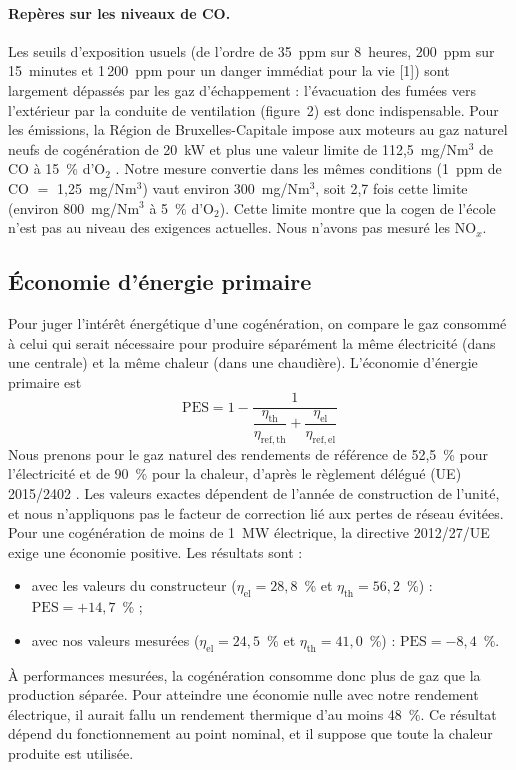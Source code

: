 \paragraph{Repères sur les niveaux de CO.} Les seuils d'exposition
usuels (de l'ordre de 35~ppm sur 8~heures, 200~ppm sur 15~minutes et
1\,200~ppm pour un danger immédiat pour la vie [1]) sont largement
dépassés par les gaz d'échappement : l'évacuation des fumées vers
l'extérieur par la conduite de ventilation (figure~2) est donc
indispensable. Pour les émissions, la Région de Bruxelles-Capitale
impose aux moteurs au gaz naturel neufs de cogénération de 20~kW et plus
une valeur limite de 112,5~mg/Nm$^3$ de CO à 15~\% d'O$_2$
\cite{bxl_cogeneration}. Notre mesure convertie dans les mêmes
conditions (1~ppm de CO $=$ 1,25~mg/Nm$^3$) vaut environ 300~mg/Nm$^3$,
soit 2,7 fois cette limite (environ 800~mg/Nm$^3$ à 5~\% d'O$_2$). Cette
limite montre que la cogen de l'école n'est pas au
niveau des exigences actuelles. Nous n'avons pas mesuré les NO$_x$.

\subsection{Économie d'énergie primaire}
\label{sec:pes}

Pour juger l'intérêt énergétique d'une cogénération, on compare le gaz
consommé à celui qui serait nécessaire pour produire séparément la même
électricité (dans une centrale) et la même chaleur (dans une chaudière).
L'économie d'énergie primaire est
\begin{equation}
  \mathrm{PES} = 1 - \frac{1}{\dfrac{\eta_{\mathrm{th}}}{\eta_{\mathrm{ref,th}}} + \dfrac{\eta_{\mathrm{el}}}{\eta_{\mathrm{ref,el}}}}
  \label{eq:pes}
\end{equation}
Nous prenons pour le gaz naturel des rendements de référence de 52,5~\%
pour l'électricité et de 90~\% pour la chaleur, d'après le règlement
délégué (UE) 2015/2402 \cite{reglement_ref}. Les valeurs exactes
dépendent de l'année de construction de l'unité, et nous n'appliquons
pas le facteur de correction lié aux pertes de réseau évitées. Pour une
cogénération de moins de 1~MW électrique, la directive 2012/27/UE exige
une économie positive. Les résultats sont :
\begin{itemize}
  \item avec les valeurs du constructeur ($\eta_{\mathrm{el}} = 28{,}8$~\%
  et $\eta_{\mathrm{th}} = 56{,}2$~\%) : $\mathrm{PES} = +14{,}7$~\% ;
  \item avec nos valeurs mesurées ($\eta_{\mathrm{el}} = 24{,}5$~\%
  et $\eta_{\mathrm{th}} = 41{,}0$~\%) : $\mathrm{PES} = -8{,}4$~\%.
\end{itemize}
À performances mesurées, la cogénération consomme donc plus de gaz que
la production séparée. Pour atteindre une économie nulle avec notre
rendement électrique, il aurait fallu un rendement thermique d'au moins
48~\%. Ce résultat dépend du fonctionnement au point nominal, et il suppose
que toute la chaleur produite est utilisée.
